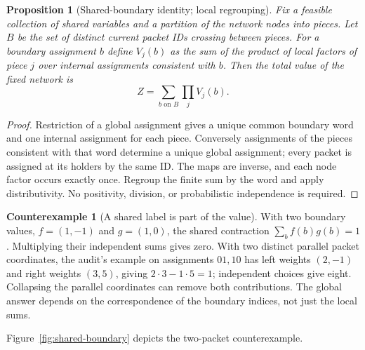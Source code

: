 \documentclass[11pt,letterpaper]{article}
\newtheorem{proposition}[theorem]{Proposition}
\theoremstyle{definition}\newtheorem{definition}[theorem]{Definition}\newtheorem{example}[theorem]{Example}
\newtheorem{counterexample}[theorem]{Counterexample}
\theoremstyle{remark}\newtheorem{remark}[theorem]{Remark}
\begin{document}
\begin{proposition}[Shared-boundary identity; local regrouping]\label{prop:glue}
Fix a feasible collection of shared variables and a partition of the network nodes into pieces. Let $B$ be the set of distinct current packet IDs crossing between pieces. For a boundary assignment $b$ define $V_j(b)$ as the sum of the product of local factors of piece $j$ over internal assignments consistent with $b$. Then the total value of the fixed network is
\begin{equation}\label{eq:glue}
 Z=\sum_{b\text{ on }B}\prod_j V_j(b).
\end{equation}
\end{proposition}
\begin{proof}
Restriction of a global assignment gives a unique common boundary word and one internal assignment for each piece. Conversely assignments of the pieces consistent with that word determine a unique global assignment; every packet is assigned at its holders by the same ID. The maps are inverse, and each node factor occurs exactly once. Regroup the finite sum by the word and apply distributivity. No positivity, division, or probabilistic independence is required.
\end{proof}
\begin{counterexample}[A shared label is part of the value]
With two boundary values, $f=(1,-1)$ and $g=(1,0)$, the shared contraction $\sum_b f(b)g(b)=1$. Multiplying their independent sums gives zero. With two distinct parallel packet coordinates, the audit's example on assignments $01,10$ has left weights $(2,-1)$ and right weights $(3,5)$, giving $2\cdot3-1\cdot5=1$; independent choices give eight. Collapsing the parallel coordinates can remove both contributions. The global answer depends on the correspondence of the boundary indices, not just the local sums.
\end{counterexample}
Figure~\ref{fig:shared-boundary} depicts the two-packet counterexample.
\end{document}

